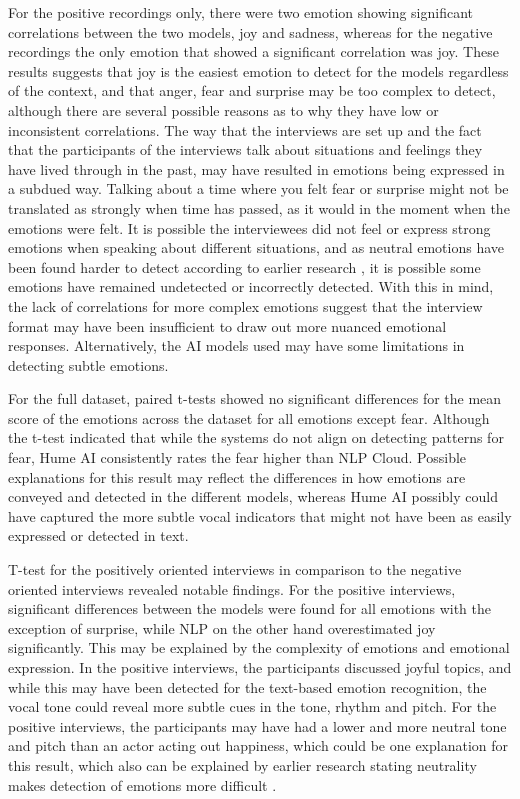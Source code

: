 For the positive recordings only, there were two emotion showing significant correlations between the two models, joy and sadness, whereas for the negative recordings the only emotion that showed a significant correlation was joy. These results suggests that joy is the easiest emotion to detect for the models regardless of the context, and that anger, fear and surprise may be too complex to detect, although there are several possible reasons as to why they have low or inconsistent correlations. The way that the interviews are set up and the fact that the participants of the interviews talk about situations and feelings they have lived through in the past, may have resulted in emotions being expressed in a subdued way. Talking about a time where you felt fear or surprise might not be translated as strongly when time has passed, as it would in the moment when the emotions were felt. It is possible the interviewees did not feel or express strong emotions when speaking about different situations, and as neutral emotions have been found harder to detect according to earlier research \autocite{Cao2015}, it is possible some emotions have remained undetected or incorrectly detected. With this in mind, the lack of correlations for more complex emotions suggest that the interview format may have been insufficient to draw out more nuanced emotional responses. Alternatively, the AI models used may have some limitations in detecting subtle emotions.

For the full dataset, paired t-tests showed no significant differences for the mean score of the emotions across the dataset for all emotions except fear. Although the t-test indicated that while the systems do not align on detecting patterns for fear, Hume AI consistently rates the fear higher than NLP Cloud. Possible explanations for this result may reflect the differences in how emotions are conveyed and detected in the different models, whereas Hume AI possibly could have captured the more subtle vocal indicators that might not have been as easily expressed or detected in text.

T-test for the positively oriented interviews in comparison to the negative oriented interviews revealed notable findings. For the positive interviews, significant differences between the models were found for all emotions with the exception of surprise, while NLP on the other hand overestimated joy significantly. This may be explained by the complexity of emotions and emotional expression. In the positive interviews, the participants discussed joyful topics, and while this may have been detected for the text-based emotion recognition, the vocal tone could reveal more subtle cues in the tone, rhythm and pitch. For the positive interviews, the participants may have had a lower and more neutral tone and pitch than an actor acting out happiness, which could be one explanation for this result, which also can be explained by earlier research stating neutrality makes detection of emotions more difficult \autocite{Cao2015}.

